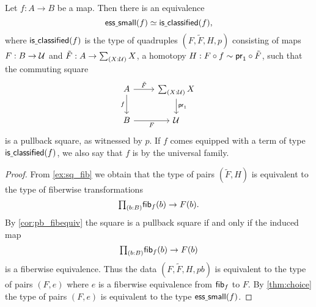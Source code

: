 \begin{thm}\label{thm:classifier}
Let $f:A\to B$ be a map. Then there is an equivalence
\begin{equation*}
\eqv{\esssmall(f)}{\isclassified(f)},
\end{equation*}
where $\mathsf{is\underline{\ }{}classified}(f)$ is the type of quadruples $(F,\tilde{F},H,p)$ consisting of maps
$F:B\to \mathcal{U}$ and $\tilde{F}:A\to \sm{X:\UU}X$, a homotopy $H:F\circ f\sim \mathsf{pr}_{1}\circ \tilde{F}$,  such that the commuting square
\begin{equation*}
\begin{tikzcd}
A \arrow[r,"\tilde{F}"] \arrow[d,swap,"f"] & \sm{X:\UU}X \arrow[d,"\proj 1"] \\
B \arrow[r,swap,"F"] & \UU
\end{tikzcd}
\end{equation*}
is a pullback square, as witnessed by $p$. If $f$ comes equipped with a term of type $\mathsf{is\underline{\ }{}classified}(f)$, we also say that $f$ is  by the universal family. 
\end{thm}

\begin{proof}
From \cref{ex:sq_fib} we obtain that the type of pairs $(\tilde{F},H)$ is equivalent to the type of fiberwise transformations
\begin{equation*}
\prd{b:B}\fib{f}{b}\to F(b).
\end{equation*}
By \cref{cor:pb_fibequiv} the square is a pullback square if and only if the induced map
\begin{equation*}
\prd{b:B}\fib{f}{b}\to F(b)
\end{equation*}
is a fiberwise equivalence. Thus the data $(F,\tilde{F},H,pb)$ is equivalent to the type of pairs $(F,e)$ where $e$ is a fiberwise equivalence from $\mathsf{fib}_{f}$ to $F$. By \cref{thm:choice} the type of pairs $(F,e)$ is equivalent to the type $\mathsf{ess\underline{\ }{}small}(f)$. 
\end{proof}

